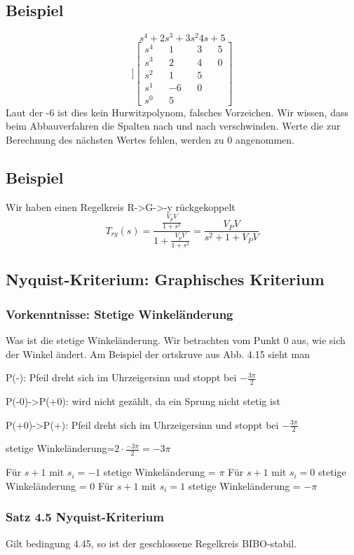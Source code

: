\documentclass[a4paper]{article}
\begin{document}
\subsection*{Beispiel}
\[ s^{4}+2s^{3}+3s^{2}4s+5 \]
\[]
\begin{bmatrix}
s^{4} && 1 && 3 && 5\\
s^{3} && 2 && 4 && 0\\
s^{2} && 1 && 5\\
s^{1} && -6 && 0\\
s^{0} && 5
\end{bmatrix} 
\]
Laut der -6 ist dies kein Hurwitzpolynom, falsches Vorzeichen.
Wir wissen, dass beim Abbauverfahren die Spalten nach und nach verschwinden. Werte die zur Berechnung des nächsten Wertes fehlen, werden zu 0 angenommen. 

\subsection*{Beispiel}
Wir haben einen Regelkreis R->G->-y rückgekoppelt
\[ T_{ry}(s)=\frac{\frac{V_{p}V}{1+s^{2}}}{1+\frac{V_{p}V}{1+s^{2}}}=\frac{V_{P}V}{s^{2}+1+V_{P}V} \]

\subsection*{Nyquist-Kriterium: Graphisches Kriterium}
\subsubsection*{Vorkenntnisse: Stetige Winkeländerung}
Was ist die stetige Winkeländerung. Wir betrachten vom Punkt 0 aus, wie sich der Winkel ändert. Am Beispiel der ortskruve aus Abb. 4.15 sieht man
\begin{iteimize}
\item P(-\infty): Pfeil dreht sich im Uhrzeigersinn und stoppt bei $-\frac{3\pi}{2}$
\item P(-0)->P(+0): wird nicht gezählt,  da ein Sprung nicht stetig ist
\item P(+0)->P(+\infty): Pfeil dreht sich im Uhrzeigersinn und stoppt bei $-\frac{3\pi}{2}$
\end{iteimize}
stetige Winkeländerung=$ 2\cdot \frac{-3\pi}{2}=-3\pi $

Für $s+1$ mit  $s_{i}=-1$
 stetige Winkeländerung = $\pi$
Für $s+1$ mit  $s_{i}=0$
 stetige Winkeländerung = $0$
Für $s+1$ mit  $s_{i}=1$
 stetige Winkeländerung = $-\pi$

\subsubsection*{Satz 4.5 Nyquist-Kriterium}
Gilt bedingung 4.45, so ist der geschlossene Regelkreis BIBO-stabil.
\end{document}
